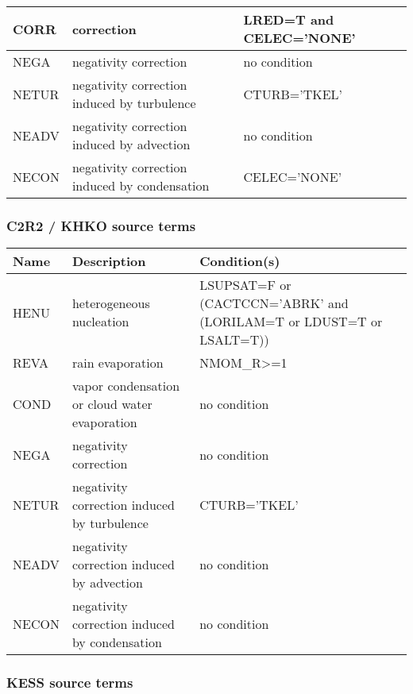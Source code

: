 \begin{longtable} {|p{}|p{}|p{}|}
CORR   & correction                                    & LRED=T and CELEC='NONE' \\\hline
NEGA   & negativity correction                         & no condition \\\hline
NETUR  & negativity correction induced by turbulence   & CTURB='TKEL' \\\hline
NEADV  & negativity correction induced by advection    & no condition \\\hline
NECON  & negativity correction induced by condensation & CELEC='NONE' \\\hline
\end{longtable}

\subsubsection{C2R2 / KHKO source terms}

\begin{longtable} {|p{}|p{}|p{}|}
\hline
Name & Description & Condition(s) \\
\hline \hline
\endhead
HENU   & heterogeneous nucleation                      & LSUPSAT=F or (CACTCCN='ABRK' and (LORILAM=T or LDUST=T or LSALT=T)) \\\hline
REVA   & rain evaporation                              & NMOM\_R>=1 \\\hline
COND   & vapor condensation or cloud water evaporation & no condition \\\hline
NEGA   & negativity correction                         & no condition \\\hline
NETUR  & negativity correction induced by turbulence   & CTURB='TKEL' \\\hline
NEADV  & negativity correction induced by advection    & no condition \\\hline
NECON  & negativity correction induced by condensation & no condition \\\hline
\end{longtable}

\subsubsection{KESS source terms}

